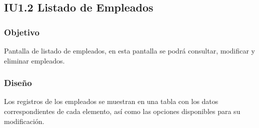 \newpage
\subsection{IU1.2 Listado de Empleados}

\subsubsection{Objetivo}
	Pantalla de listado de empleados, en esta pantalla se podrá consultar, modificar y eliminar empleados.  

\subsubsection{Diseño}
	Los registros de los empleados se muestran en una tabla con los datos correspondientes de cada elemento, así como las opciones disponibles para su modificación. 

